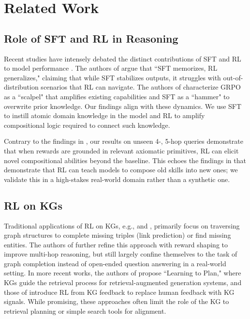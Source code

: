 \documentclass{article}
\theoremstyle{plain}
\theoremstyle{definition}
\theoremstyle{remark}
\begin{document}
\section{Related Work}


\subsection{Role of SFT and RL in Reasoning}
Recent studies have intensely debated the distinct contributions of SFT and RL to model performance \citep{jin2025rl, kang2025quagmires, matsutani2025rl}. The authors of \cite{chu2025sft} argue that ``SFT memorizes, RL generalizes," claiming that while SFT stabilizes outputs, it struggles with out-of-distribution scenarios that RL can navigate. The authors of \cite{Rajani2025} characterize GRPO as a ``scalpel" that amplifies existing capabilities and SFT as a ``hammer" to overwrite prior knowledge. Our findings align with these dynamics. We use SFT to instill atomic domain knowledge in the model and RL to amplify compositional logic required to connect such knowledge.


Contrary to the findings in \cite{yue2025does}, our results on unseen 4-, 5-hop queries demonstrate that when rewards are grounded in relevant axiomatic primitives, RL can elicit novel compositional abilities beyond the baseline. This echoes the findings in \cite{yuan2025f} that demonstrate that RL can teach models to compose old skills into new ones; we validate this in a high-stakes real-world domain rather than a synthetic one. 

\subsection{RL on KGs}
Traditional applications of RL on KGs, e.g., \cite{DasGOLEARNING} and \cite{xiong2017deeppath}, primarily focus on traversing graph structures to complete missing triples (link prediction) or find missing entities. The authors of \cite{lin2018multi} further refine this approach with reward shaping to improve multi-hop reasoning, but still largely confine themselves to the task of graph completion instead of open-ended question answering in a real-world setting. In more recent works, the authors of \cite{Wang2024} propose ``Learning to Plan," where KGs guide the retrieval process for retrieval-augmented generation systems, and those of \cite{YanRLKGF} introduce RL from KG feedback to replace human feedback with KG signals. While promising, these approaches often limit the role of the KG to retrieval planning or simple search tools for alignment.
\end{document}
